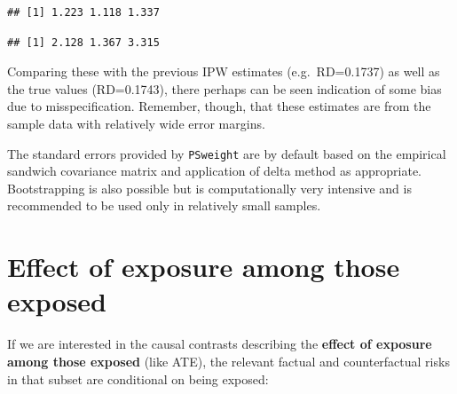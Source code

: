 \documentclass[
]{book}
\newenvironment{Shaded}{\begin{snugshade}}{\end{snugshade}}
\newcommand{\AttributeTok}[1]{\textcolor[rgb]{0.13,0.29,0.53}{#1}}
\newcommand{\CommentTok}[1]{\textcolor[rgb]{0.56,0.35,0.01}{\textit{#1}}}
\newcommand{\DecValTok}[1]{\textcolor[rgb]{0.00,0.00,0.81}{#1}}
\newcommand{\FunctionTok}[1]{\textcolor[rgb]{0.13,0.29,0.53}{\textbf{#1}}}
\newcommand{\NormalTok}[1]{#1}
\newcommand{\SpecialCharTok}[1]{\textcolor[rgb]{0.81,0.36,0.00}{\textbf{#1}}}
\newcommand{\StringTok}[1]{\textcolor[rgb]{0.31,0.60,0.02}{#1}}
\theoremstyle{definition}
\theoremstyle{definition}
\theoremstyle{definition}
\theoremstyle{definition}
\theoremstyle{remark}
\begin{document}
\begin{Shaded}
\end{Shaded}

\begin{verbatim}
## [1] 1.223 1.118 1.337
\end{verbatim}

\begin{Shaded}
\end{Shaded}

\begin{verbatim}
## [1] 2.128 1.367 3.315
\end{verbatim}

Comparing these with the previous IPW estimates (e.g.~RD=0.1737) as well
as the true values (RD=0.1743), there perhaps can be seen indication of
some bias due to misspecification. Remember, though, that these
estimates are from the sample data with relatively wide error margins.

The standard errors provided by \texttt{PSweight} are by default based on the
empirical sandwich covariance matrix and application of delta method as
appropriate. Bootstrapping is also possible but is computationally very
intensive and is recommended to be used only in relatively small
samples.

\section{Effect of exposure among those exposed}\label{effect-of-exposure-among-those-exposed}

If we are interested in the causal contrasts describing the \textbf{effect of
exposure among those exposed} (like ATE), the relevant factual and
counterfactual risks in that subset are conditional on being exposed:
\end{document}
